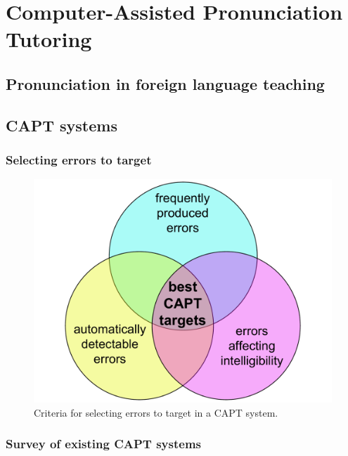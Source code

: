 %
%

\chapter{Computer-Assisted Pronunciation Tutoring}


\blindtext 
\section{Pronunciation in foreign language teaching}
\blindtext
\section{CAPT systems}
	\subsection{Selecting errors to target}
	\blindtext
		\begin{center}
		\begin{figure}[htb]
			\includegraphics[width=.7\textwidth]{../img/error-venn}
			\caption{Criteria for selecting errors to target in a CAPT system.}
			\label{fig:errors}
		\end{figure}
		\end{center}
	\subsection{Survey of existing CAPT systems}
	
%
